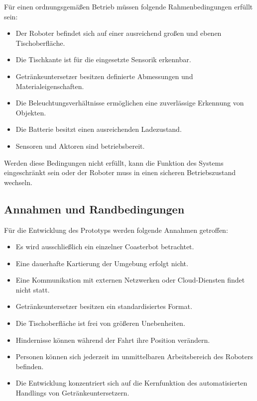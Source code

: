 Für einen ordnungsgemäßen Betrieb müssen folgende Rahmenbedingungen
erfüllt sein:

\begin{itemize}
\tightlist
\item
  Der Roboter befindet sich auf einer ausreichend großen und ebenen
  Tischoberfläche.
\item
  Die Tischkante ist für die eingesetzte Sensorik erkennbar.
\item
  Getränkeuntersetzer besitzen definierte Abmessungen und
  Materialeigenschaften.
\item
  Die Beleuchtungsverhältnisse ermöglichen eine zuverlässige Erkennung
  von Objekten.
\item
  Die Batterie besitzt einen ausreichenden Ladezustand.
\item
  Sensoren und Aktoren sind betriebsbereit.
\end{itemize}

Werden diese Bedingungen nicht erfüllt, kann die Funktion des Systems
eingeschränkt sein oder der Roboter muss in einen sicheren
Betriebszustand wechseln.

\subsection{Annahmen und
Randbedingungen}\label{annahmen-und-randbedingungen}

Für die Entwicklung des Prototyps werden folgende Annahmen getroffen:

\begin{itemize}
\tightlist
\item
  Es wird ausschließlich ein einzelner Coasterbot betrachtet.
\item
  Eine dauerhafte Kartierung der Umgebung erfolgt nicht.
\item
  Eine Kommunikation mit externen Netzwerken oder Cloud-Diensten findet
  nicht statt.
\item
  Getränkeuntersetzer besitzen ein standardisiertes Format.
\item
  Die Tischoberfläche ist frei von größeren Unebenheiten.
\item
  Hindernisse können während der Fahrt ihre Position verändern.
\item
  Personen können sich jederzeit im unmittelbaren Arbeitsbereich des
  Roboters befinden.
\item
  Die Entwicklung konzentriert sich auf die Kernfunktion des
  automatisierten Handlings von Getränkeuntersetzern.
\end{itemize}

